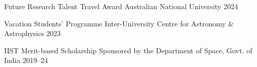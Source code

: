 
\begin{cvhonors}
    \cvhonor
    {Future Research Talent Travel Award} %
    {Australian National University} %
    {} %
    {2024} %

    \cvhonor
    {Vacation Students' Programme} %
    {Inter-University Centre for Astronomy \& Astrophysics} %
    {} %
    {2023} %

    \cvhonor
    {IIST Merit-based Scholarship} %
    {Sponsored by the Department of Space, Govt. of India} %
    {} %
    {2019--24} %

\end{cvhonors}
